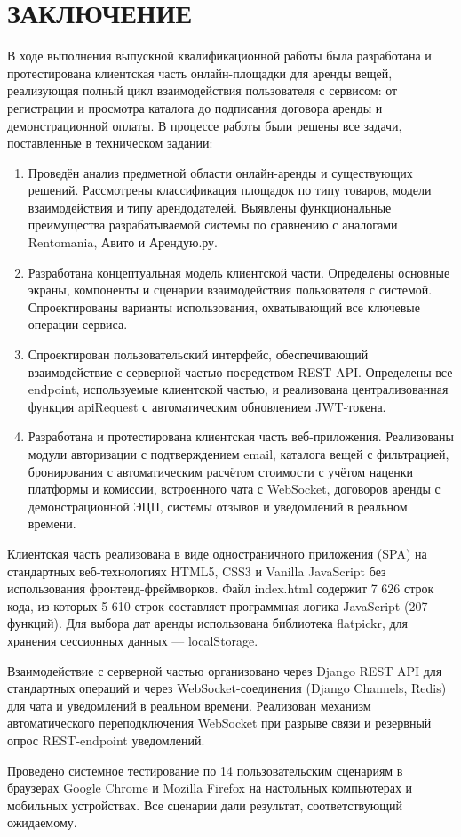 \section*{ЗАКЛЮЧЕНИЕ}

В ходе выполнения выпускной квалификационной работы была разработана и протестирована клиентская часть онлайн-площадки для аренды вещей, реализующая полный цикл взаимодействия пользователя с сервисом: от регистрации и просмотра каталога до подписания договора аренды и демонстрационной оплаты.
В процессе работы были решены все задачи, поставленные в техническом задании:

\begin{enumerate}
\item Проведён анализ предметной области онлайн-аренды и существующих решений. Рассмотрены классификация площадок по типу товаров, модели взаимодействия и типу арендодателей. Выявлены функциональные преимущества разрабатываемой системы по сравнению с аналогами Rentomania, Авито и Арендую.ру.
\item Разработана концептуальная модель клиентской части. Определены основные экраны, компоненты и сценарии взаимодействия пользователя с системой. Спроектированы варианты использования, охватывающий все ключевые операции сервиса.
\item Спроектирован пользовательский интерфейс, обеспечивающий взаимодействие с серверной частью посредством REST API. Определены все endpoint, используемые клиентской частью, и реализована централизованная функция apiRequest с автоматическим обновлением JWT-токена.
\item Разработана и протестирована клиентская часть веб-приложения. Реализованы модули авторизации с подтверждением email, каталога вещей с фильтрацией, бронирования с автоматическим расчётом стоимости с учётом наценки платформы и комиссии, встроенного чата с WebSocket, договоров аренды с демонстрационной ЭЦП, системы отзывов и уведомлений в реальном времени.
\end{enumerate}

Клиентская часть реализована в виде одностраничного приложения (SPA) на стандартных веб-технологиях HTML5, CSS3 и Vanilla JavaScript без использования фронтенд-фреймворков. Файл index.html содержит 7 626 строк кода, из которых 5 610 строк составляет программная логика JavaScript (207 функций). Для выбора дат аренды использована библиотека flatpickr, для хранения сессионных данных — localStorage.

Взаимодействие с серверной частью организовано через Django REST API для стандартных операций и через WebSocket-соединения (Django Channels, Redis) для чата и уведомлений в реальном времени. Реализован механизм автоматического переподключения WebSocket при разрыве связи и резервный опрос REST-endpoint уведомлений.

Проведено системное тестирование по 14 пользовательским сценариям в браузерах Google Chrome и Mozilla Firefox на настольных компьютерах и мобильных устройствах. Все сценарии дали результат, соответствующий ожидаемому.

